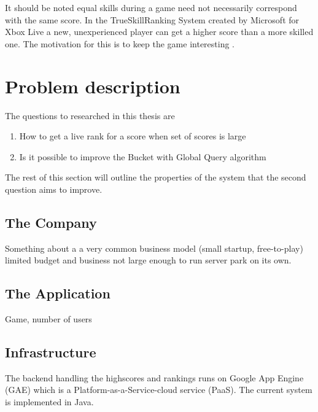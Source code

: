 It should be noted equal skills during a game need not necessarily correspond with the same score. In the TrueSkill\texttrademark Ranking System created by Microsoft for Xbox Live a new, unexperienced player can get a higher score than a more skilled one. The motivation for this is to keep the game interesting \cite{trueskill}. 


\section{Problem description}

The questions to researched in this thesis are

\begin{enumerate}
   \setlength\itemsep{-0.4em}
\item How to get a live rank for a score when set of scores is large
  \item Is it possible to improve the Bucket with Global Query algorithm
\end{enumerate}

The rest of this section will outline the properties of the system that the second question aims to improve.

\subsection{The Company}

Something about a a very common business model (small startup, free-to-play) limited budget and business not large enough to run server park on its own.

\subsection{The Application}

Game, number of users

\subsection{Infrastructure}

The backend handling the highscores and rankings runs on Google App Engine (GAE) which is a Platform-as-a-Service-cloud service (PaaS). The current system is implemented in Java.

